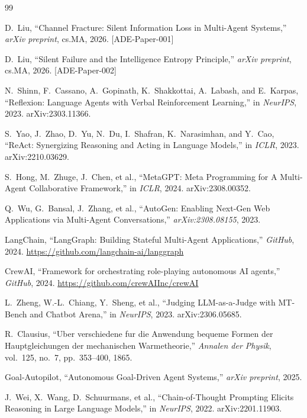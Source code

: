 \documentclass[11pt,a4paper]{article}
\begin{document}
\begin{thebibliography}{99}

D.~Liu, ``Channel Fracture: Silent Information Loss in Multi-Agent Systems,''
\textit{arXiv preprint}, cs.MA, 2026. [ADE-Paper-001]

D.~Liu, ``Silent Failure and the Intelligence Entropy Principle,''
\textit{arXiv preprint}, cs.MA, 2026. [ADE-Paper-002]

N.~Shinn, F.~Cassano, A.~Gopinath, K.~Shakkottai, A.~Labash, and E.~Karpas,
``Reflexion: Language Agents with Verbal Reinforcement Learning,''
in \textit{NeurIPS}, 2023. arXiv:2303.11366.

S.~Yao, J.~Zhao, D.~Yu, N.~Du, I.~Shafran, K.~Narasimhan, and Y.~Cao,
``ReAct: Synergizing Reasoning and Acting in Language Models,''
in \textit{ICLR}, 2023. arXiv:2210.03629.

S.~Hong, M.~Zhuge, J.~Chen, et al.,
``MetaGPT: Meta Programming for A Multi-Agent Collaborative Framework,''
in \textit{ICLR}, 2024. arXiv:2308.00352.

Q.~Wu, G.~Bansal, J.~Zhang, et al.,
``AutoGen: Enabling Next-Gen Web Applications via Multi-Agent Conversations,''
\textit{arXiv:2308.08155}, 2023.

LangChain,
``LangGraph: Building Stateful Multi-Agent Applications,''
\textit{GitHub}, 2024. \url{https://github.com/langchain-ai/langgraph}

CrewAI,
``Framework for orchestrating role-playing autonomous AI agents,''
\textit{GitHub}, 2024. \url{https://github.com/crewAIInc/crewAI}

L.~Zheng, W.-L.~Chiang, Y.~Sheng, et al.,
``Judging LLM-as-a-Judge with MT-Bench and Chatbot Arena,''
in \textit{NeurIPS}, 2023. arXiv:2306.05685.

R.~Clausius,
``Uber verschiedene fur die Anwendung bequeme Formen der Hauptgleichungen der mechanischen Warmetheorie,''
\textit{Annalen der Physik}, vol.~125, no.~7, pp.~353--400, 1865.

Goal-Autopilot,
``Autonomous Goal-Driven Agent Systems,''
\textit{arXiv preprint}, 2025.

J.~Wei, X.~Wang, D.~Schuurmans, et al.,
``Chain-of-Thought Prompting Elicits Reasoning in Large Language Models,''
in \textit{NeurIPS}, 2022. arXiv:2201.11903.


\end{thebibliography}
\end{document}
